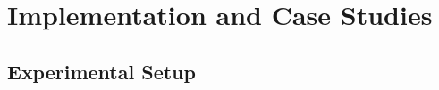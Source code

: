 \section{Implementation and Case Studies} %
\label{sec:implementation}
\subsection{Experimental Setup} %
